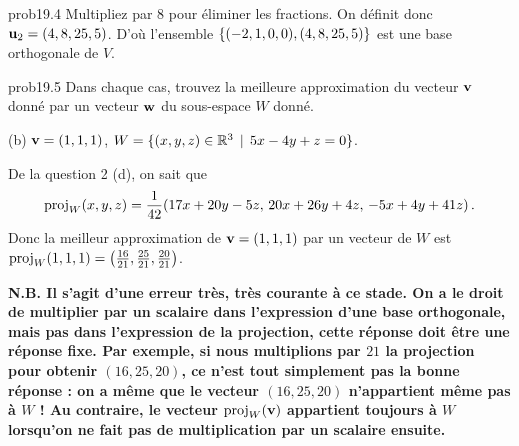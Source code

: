 \begin{sol}{prob19.4}
Multipliez par 8 pour \'eliminer les fractions. On d\'efinit donc $\mathbf{u}_2=(4, 8, 25,5)$. D'o\`u l'ensemble $\{(-2,1,0,0),(4, 8, 25,5)\}$ est une base orthogonale de $V$.
  
\medskip


\end{sol}

\bigskip
\begin{sol}{prob19.5} Dans chaque cas, trouvez la meilleure approximation du vecteur $\mathbf{v}$ donné par un vecteur $\mathbf{w}$ du sous-espace $W$ donné. \medskip

(b) $\mathbf{v}=(1,1,1)$,   $W=\{(x,y,z)\in\mathbb{R}^3 \, \mid \, 5x-4y+z=0\}$.


\soln De la question 2 (d), on sait que 
$$\operatorname{proj}_W(x,y,z)=\frac{1}{42}(17 x+20 y-5 z,\,20 x+26 y+4 z,\,-5 x+4 y+41 z)\,.$$ Donc la meilleur approximation de $\mathbf{v}=(1,1,1)$ par un vecteur de $W$ est $\operatorname{proj}_W(1,1,1)=\big(\frac{16}{21},\frac{25}{21},\frac{20}{21}\big)$.

\medskip
{\bf N.B.  Il s'agit d'une erreur très, très courante à ce stade. On a le droit de multiplier par un scalaire dans l'expression d'une base orthogonale, mais pas dans l'expression de la projection, cette réponse doit être une réponse fixe.  Par exemple, si nous multiplions par $21$ la projection pour obtenir $(16,25,20)$, ce n'est tout simplement pas la bonne réponse : on a même que le vecteur $(16,25,20)$ n'appartient même pas à  $W$ ! Au contraire, le vecteur $\operatorname{proj}_W(\mathbf{v})$ appartient toujours à $W$ lorsqu'on ne fait pas de multiplication par un scalaire ensuite.}
\medskip


\end{sol}

